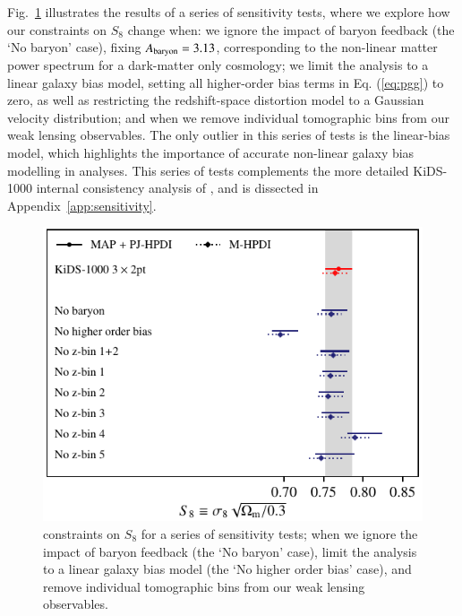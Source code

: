Fig.~\ref{fig:S8comp_sensitivity} illustrates the results of a series of sensitivity tests, where we explore how our \tttp constraints on $S_8$ change when: 
we ignore the impact of baryon feedback (the `No baryon' case), fixing $A_{\rm baryon}=3.13$, corresponding to the non-linear matter power spectrum for a dark-matter only cosmology; 
we limit the analysis to a linear galaxy bias model, setting all higher-order bias terms in Eq. (\ref{eq:pgg}) to zero, as well as restricting the redshift-space distortion model to a Gaussian velocity distribution; 
and when we remove individual tomographic bins from our weak lensing observables. 
The only outlier in this series of tests is the linear-bias model, which highlights the importance of accurate non-linear galaxy bias modelling in \tttp analyses. 
This series of tests complements the more detailed KiDS-1000 internal consistency analysis of \citet{asgari/etal:inprep}, and is dissected in Appendix~\ref{app:sensitivity}.

\begin{figure}
	\begin{center}
		\includegraphics[width=\columnwidth]{Parameter_Plots/systematics/S8_comparison_blindC}
		\caption{\tttp constraints on $S_8$ for a series of sensitivity tests; when we ignore the impact of baryon feedback (the `No baryon' case), limit the analysis to a linear galaxy bias model (the `No higher order bias' case), and remove individual tomographic bins from our weak lensing observables.    
		\label{fig:S8comp_sensitivity}}
	\end{center}
\end{figure}

